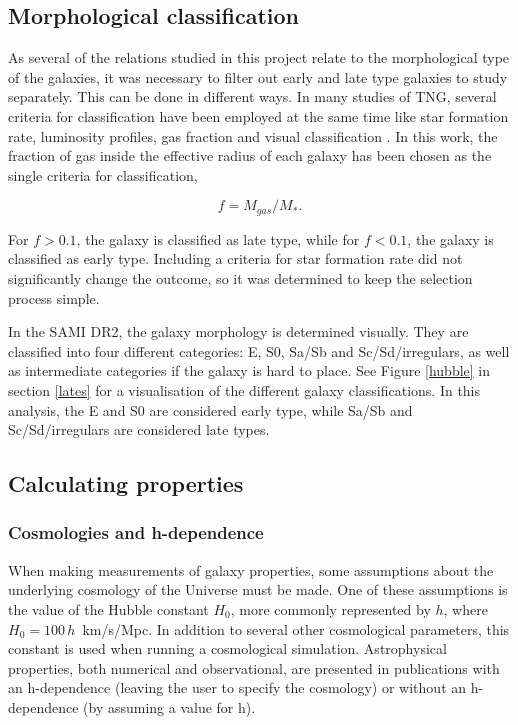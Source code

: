 \subsection{Morphological classification}
As several of the relations studied in this project relate to the morphological type of the galaxies, it was necessary to filter out early and late type galaxies to study separately. This can be done in different ways. In many studies of TNG, several criteria for classification have been employed at the same time like star formation rate, luminosity profiles, gas fraction and visual classification \parencite[see e.g.][]{Lu2020,Genel2017}. In this work, the fraction of gas inside the effective radius of each galaxy has been chosen as the single criteria for classification, 

\begin{equation}
    f = M_{gas}/M_*.
\end{equation}

For $f > 0.1$, the galaxy is classified as late type, while for $f< 0.1$, the galaxy is classified as early type. Including a criteria for star formation rate did not significantly change the outcome, so it was determined to keep the selection process simple.

In the SAMI DR2, the galaxy morphology is determined visually. They are classified into four different categories: E, S0, Sa/Sb and Sc/Sd/irregulars, as well as intermediate categories if the galaxy is hard to place. See Figure \ref{hubble} in section \ref{lates} for a visualisation of the different galaxy classifications. In this analysis, the E and S0 are considered early type, while Sa/Sb and Sc/Sd/irregulars are considered late types.

\subsection{Calculating properties}

\subsubsection{Cosmologies and h-dependence} \label{cosmologies}
When making measurements of galaxy properties, some assumptions about the underlying cosmology of the Universe must be made. One of these assumptions is the value of the Hubble constant $H_0$, more commonly represented by $h$, where $H_0 = 100\,h\,$ km/s/Mpc. In addition to several other cosmological parameters, this constant is used when running a cosmological simulation. Astrophysical properties, both numerical and observational, are presented in publications with an h-dependence (leaving the user to specify the cosmology) or without an h-dependence (by assuming a value for h).

